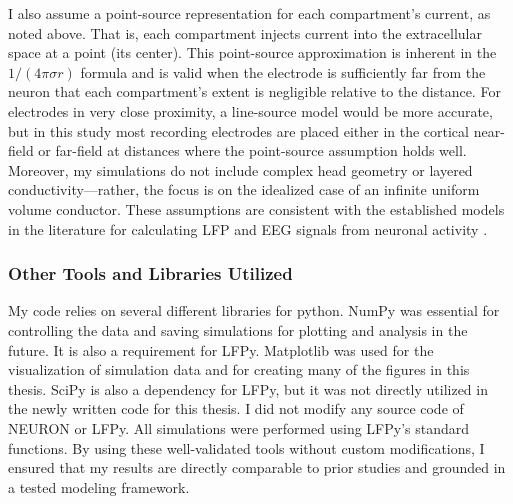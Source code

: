 \documentclass[final, a4paper,masters,en,listoffigures,listoftables,norwegiandates]{NMBU}
\begin{document}
I also assume a point-source representation for each compartment’s current, as noted above. That is, each compartment injects current into the extracellular space at a point (its center). This point-source approximation is inherent in the $1/(4\pi\sigma r)$ formula and is valid when the electrode is sufficiently far from the neuron that each compartment’s extent is negligible relative to the distance. For electrodes in very close proximity, a line-source model would be more accurate, but in this study most recording electrodes are placed either in the cortical near-field or far-field at distances where the point-source assumption holds well. Moreover, my simulations do not include complex head geometry or layered conductivity—rather, the focus is on the idealized case of an infinite uniform volume conductor. These assumptions are consistent with the established models in the literature for calculating LFP and EEG signals from neuronal activity \cite{Linden2014}. 

\subsubsection{Other Tools and Libraries Utilized}
My code relies on several different libraries for python. NumPy \cite{NumPy} was essential for controlling the data and saving simulations for plotting and analysis in the future. It is also a requirement for LFPy. Matplotlib \cite{Matplotlib} was used for the visualization of simulation data and for creating many of the figures in this thesis. SciPy \cite{SciPy} is also a dependency for LFPy, but it was not directly utilized in the newly written code for this thesis. 
I did not modify any source code of NEURON or LFPy. All simulations were performed using LFPy’s standard functions. By using these well-validated tools without custom modifications, I ensured that my results are directly comparable to prior studies and grounded in a tested modeling framework.
\end{document}
